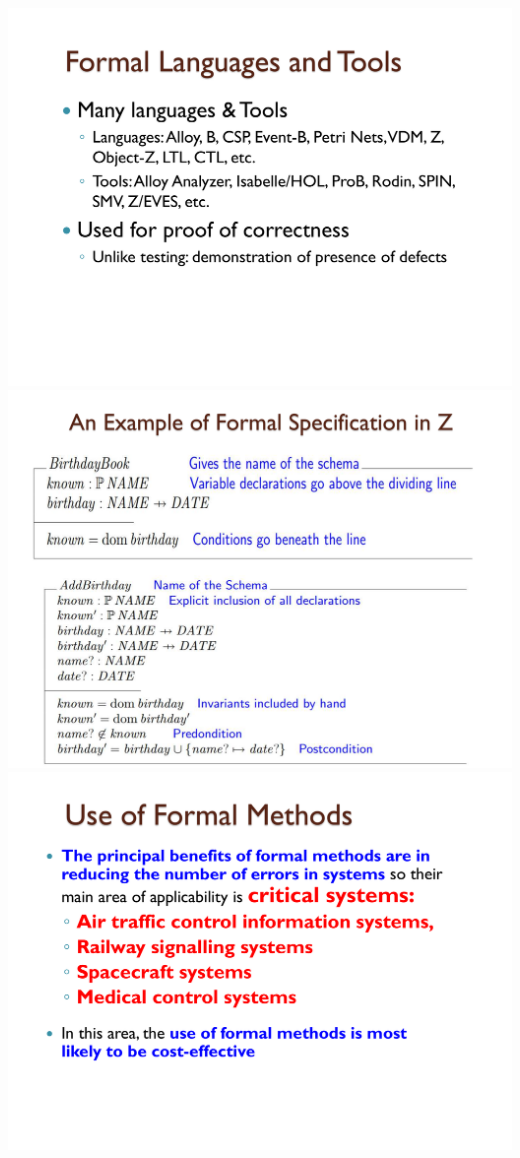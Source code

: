 \documentclass[a4paper]{article}
\begin{document}
\begin{multicols}{3}
        \includegraphics[width=\linewidth]{443.pdf}\\
        \includegraphics[width=\linewidth]{444.pdf}\\
        \includegraphics[width=\linewidth]{448.pdf}\\

\end{multicols}
\end{document}
